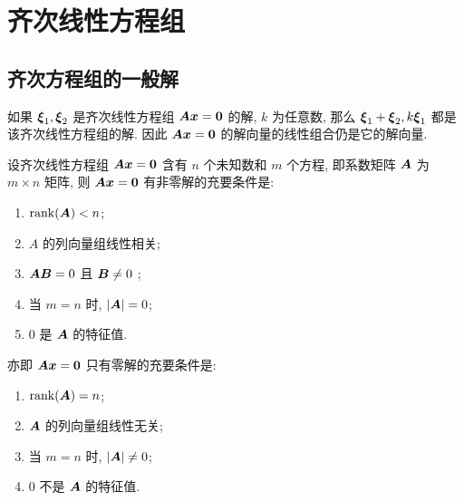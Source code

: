 \section{齐次线性方程组}

\subsection{齐次方程组的一般解}

\begin{theorem}[齐次解的线性组合]
    如果 $ \vb*{\xi}_{1}, \vb*{\xi}_{2} $ 是齐次线性方程组 $ \vb*{Ax}=\vb*{0} $ 的解, $ k $ 为任意数, 那么 $ \vb*{\xi}_{1}+\vb*{\xi}_{2}, k \vb*{\xi}_{1} $ 都是该齐次线性方程组的解. 因此 $ \vb*{A x}=\vb*{0} $ 的解向量的线性组合仍是它的解向量.
\end{theorem}

\begin{theorem}[零解与非零解的充要条件]
    设齐次线性方程组 $ \vb*{Ax}=\vb*{0} $ 含有 $ n $ 个未知数和 $ m $ 个方程, 即系数矩阵 $ \vb*{A} $ 为 $ m \times n$ 矩阵, 则 $ \vb*{A x}=\vb*{0} $ 有非零解的充要条件是:
    \begin{enumerate}[label=(\arabic{*})]
        \item $\rank(\vb*{A})<n $;
        \item $A $ 的列向量组线性相关;
        \item $\vb*{A B}=0 $ 且 $ \vb*{B} \neq 0$ ;
        \item 当 $ m=n $ 时, $ |\vb*{A}|=0 $;
        \item $0$ 是 $\vb*{A}$ 的特征值.
    \end{enumerate}
    亦即 $ \vb*{A x}=\vb*{0} $ 只有零解的充要条件是:
    \begin{enumerate}[label=(\arabic{*})]
        \item $\rank(\vb*{A})=n$;
        \item $\vb*{A} $ 的列向量组线性无关;
        \item 当 $ m=n $ 时, $ |\vb*{A}| \neq 0 $;
        \item $0$ 不是 $\vb*{A}$ 的特征值.
    \end{enumerate}
\end{theorem}

